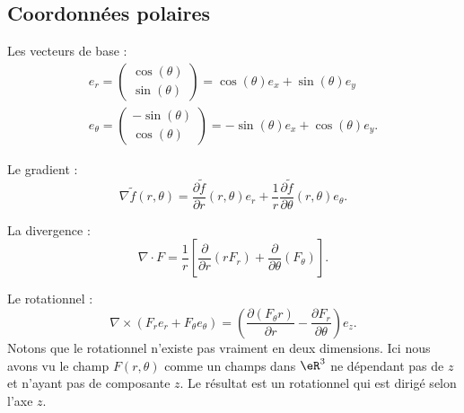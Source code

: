 \subsection{Coordonnées polaires}

Les vecteurs de base :
\begin{subequations}
    \begin{align}
    e_r=\begin{pmatrix}
        \cos(\theta)    \\
        \sin(\theta)
    \end{pmatrix}=\cos(\theta)e_x+\sin(\theta)e_y\\
    e_{\theta}=\begin{pmatrix}
        -\sin(\theta)    \\
        \cos(\theta)
    \end{pmatrix}=-\sin(\theta)e_x+\cos(\theta)e_y.
    \end{align}
\end{subequations}

Le gradient :
\begin{equation}
    \nabla\tilde f(r,\theta)=\frac{ \partial \tilde f }{ \partial r }(r,\theta)e_r+\frac{1}{ r }\frac{ \partial \tilde f }{ \partial \theta }(r,\theta)e_{\theta}.
\end{equation}

La divergence :
\begin{equation}    \label{EqgRxJKd}
    \nabla\cdot F=\frac{1}{ r }\left[ \frac{ \partial  }{ \partial r }(rF_r)+\frac{ \partial  }{ \partial \theta }(F_{\theta}) \right].
\end{equation}

Le rotationnel :
\begin{equation}    \label{EqtBnoCw}
    \nabla\times(F_re_r+F_{\theta}e_{\theta})=\left( \frac{ \partial (F_{\theta} r) }{ \partial r }-\frac{ \partial F_r }{ \partial \theta } \right)e_z.
\end{equation}
Notons que le rotationnel n'existe pas vraiment en deux dimensions. Ici nous avons vu le champ \( F(r,\theta)\) comme un champs dans \( \eR^3\) ne dépendant pas de \( z\) et n'ayant pas de composante \( z\). Le résultat est un rotationnel qui est dirigé selon l'axe \( z\).



